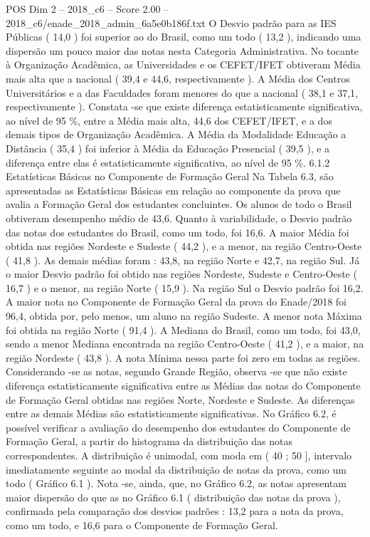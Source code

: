 \begin{textsample}{POS Dim 2 – 2018\_c6 – Score 2.00 – 2018\_c6/enade\_2018\_admin\_6a5e0b186f.txt}
O Desvio padrão para as IES Públicas ( 14,0 ) foi superior ao do Brasil, como um todo ( 13,2 ), indicando uma dispersão um pouco maior das notas nesta Categoria Administrativa.
No tocante à Organização Acadêmica, as Universidades e os CEFET/IFET obtiveram Média mais alta que a nacional ( 39,4 e 44,6, respectivamente ).
A Média dos Centros Universitários e a das Faculdades foram menores do que a nacional ( 38,1 e 37,1, respectivamente ).
Constata -se que existe diferença estatisticamente significativa, ao nível de 95 \%, entre a Média mais alta, 44,6 dos CEFET/IFET, e a dos demais tipos de Organização Acadêmica.
A Média da Modalidade Educação a Distância ( 35,4 ) foi inferior à Média da Educação Presencial ( 39,5 ), e a diferença entre elas é estatisticamente significativa, ao nível de 95 \%. 6.1.2 Estatísticas Básicas no Componente de Formação Geral Na Tabela 6.3, são apresentadas as Estatísticas Básicas em relação ao componente da prova que avalia a Formação Geral dos estudantes concluintes.
Os alunos de todo o Brasil obtiveram desempenho médio de 43,6.
Quanto à variabilidade, o Desvio padrão das notas dos estudantes do Brasil, como um todo, foi 16,6.
A maior Média foi obtida nas regiões Nordeste e Sudeste ( 44,2 ), e a menor, na região Centro-Oeste ( 41,8 ).
As demais médias foram : 43,8, na região Norte e 42,7, na região Sul.
Já o maior Desvio padrão foi obtido nas regiões Nordeste, Sudeste e Centro-Oeste ( 16,7 ) e o menor, na região Norte ( 15,9 ).
Na região Sul o Desvio padrão foi 16,2.
A maior nota no Componente de Formação Geral da prova do Enade/2018 foi 96,4, obtida por, pelo menos, um aluno na região Sudeste.
A menor nota Máxima foi obtida na região Norte ( 91,4 ).
A Mediana do Brasil, como um todo, foi 43,0, sendo a menor Mediana encontrada na região Centro-Oeste ( 41,2 ), e a maior, na região Nordeste ( 43,8 ).
A nota Mínima nessa parte foi zero em todas as regiões.
Considerando -se as notas, segundo Grande Região, observa -se que não existe diferença estatisticamente significativa entre as Médias das notas do Componente de Formação Geral obtidas nas regiões Norte, Nordeste e Sudeste.
As diferenças entre as demais Médias são estatisticamente significativas.
No Gráfico 6.2, é possível verificar a avaliação do desempenho dos estudantes do Componente de Formação Geral, a partir do histograma da distribuição das notas correspondentes.
A distribuição é unimodal, com moda em ( 40 ; 50 ], intervalo imediatamente seguinte ao modal da distribuição de notas da prova, como um todo ( Gráfico 6.1 ).
Nota -se, ainda, que, no Gráfico 6.2, as notas apresentam maior dispersão do que as no Gráfico 6.1 ( distribuição das notas da prova ), confirmada pela comparação dos desvios padrões : 13,2 para a nota da prova, como um todo, e 16,6 para o Componente de Formação Geral.

\end{textsample}
